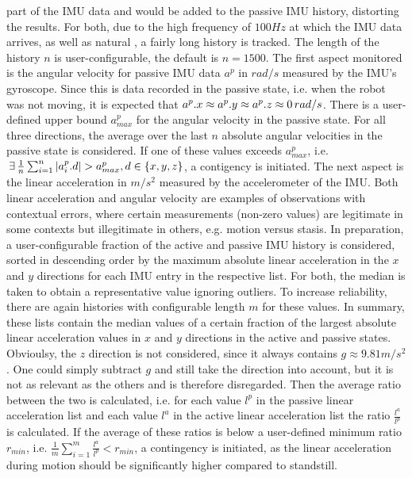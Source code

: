 \documentclass[english, master, utf8]{base/thesis_KBS}
\begin{document}
part of the IMU data and would be added to the passive IMU history, distorting the results.
For both, due to the high frequency of $100Hz$ at which the IMU data arrives, as well as natural , a fairly long
history is tracked. The length of the history $n$ is user-configurable, the default is $n = 1500$. The first aspect monitored is the angular velocity for passive IMU data $a^p$ in
$rad/s$ measured by the IMU's gyroscope.
Since this is data recorded in the passive state, i.e. when the robot was not moving, it is expected that $a^p.x \approx a^p.y \approx a^p.z \approx 0 \thinspace rad/s$.
There is a user-defined upper bound $a^p_{max}$ for the angular velocity in the passive state. For all three directions, the average over the last $n$ absolute angular velocities in
the passive state is considered. If one of these values exceeds $a^p_{max}$, i.e. $\thinspace \exists \thinspace \frac{1}{n}\sum_{i=1}^{n} |a^p_i.d| > a^p_{max}, d \in \{x, y, z\}$, a contigency is initiated.
The next aspect is the linear acceleration in $m/s^2$ measured by the accelerometer of the IMU.
Both linear acceleration and angular velocity are examples of observations with contextual errors, where certain measurements (non-zero values) are legitimate in some
contexts but illegitimate in others, e.g. motion versus stasis. \cite{Khalastchi:2018} In preparation, a user-configurable fraction of the active and passive IMU
history is considered, sorted in descending order by the maximum absolute linear acceleration in the $x$ and $y$ directions for each IMU entry in the respective list.
For both, the median is taken to obtain a representative value ignoring outliers. To increase reliability, there are again histories with configurable length $m$ for these values.
In summary, these lists contain the median values of a certain fraction of the largest absolute linear acceleration values in $x$ and $y$ directions in the active and passive states.
Obvioulsy, the $z$ direction is not considered, since it always contains $g \approx 9.81m/s^2$. One could simply subtract $g$ and still take the direction into account, but it is not
as relevant as the others and is therefore disregarded. Then the average ratio between the two is calculated, i.e. for each value $l^p$ in the passive linear acceleration list and
each value $l^a$ in the active linear acceleration list the ratio $\frac{l^a}{l^p}$ is calculated. If the average of these ratios is below a user-defined minimum ratio $r_{min}$,
i.e. $\frac{1}{m} \sum_{i=1}^{m} \frac{l^a}{l^p} < r_{min}$, a contingency is initiated, as the linear acceleration during motion should be significantly higher compared to standstill.
\end{document}
